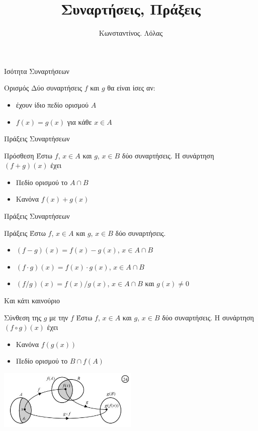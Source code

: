 \documentclass[greek]{beamer}
\title{Συναρτήσεις, Πράξεις}
\author[Λόλας]{Κωνσταντίνος. Λόλας}
\date{}
\begin{document}
\begin{frame}
 \titlepage
\end{frame}
\begin{frame}{Ισότητα Συναρτήσεων}
 \begin{block}{Ορισμός}
  Δύο συναρτήσεις $f$ και $g$ θα είναι ίσες αν:
  \begin{itemize}
   \item έχουν ίδιο πεδίο ορισμού $Α$
   \item $f(x)=g(x)$ για κάθε $x\in Α$
  \end{itemize}
 \end{block}
\end{frame}

\begin{frame}{Πράξεις Συναρτήσεων}
 \begin{block}{Πρόσθεση}
  Έστω $f$, $x\in Α$ και $g$, $x\in Β$ δύο συναρτήσεις. Η συνάρτηση $(f+g)(x)$ έχει
  \begin{itemize}
   \item Πεδίο ορισμού το $A\cap Β$
   \item Κανόνα $f(x)+g(x)$
  \end{itemize}
 \end{block}
\end{frame}

\begin{frame}{Πράξεις Συναρτήσεων}
 \begin{block}{Πράξεις}
  Έστω $f$, $x\in Α$ και $g$, $x\in Β$ δύο συναρτήσεις.
  \begin{itemize}
   \item $(f-g)(x)=f(x)-g(x)$, $x\in A\cap Β$
   \item $(f\cdot g)(x)=f(x)\cdot g(x)$, $x\in A\cap Β$
   \item $(f/g)(x)=f(x)/g(x)$, $x\in A\cap Β$ και $g(x)\ne 0$
  \end{itemize}
 \end{block}
\end{frame}

\begin{frame}{Και κάτι καινούριο}
 \begin{block}{Σύνθεση της $g$ με την $f$}
  Έστω $f$, $x\in Α$ και $g$, $x\in Β$ δύο συναρτήσεις. Η συνάρτηση $(f\circ g)(x)$ έχει
  \begin{itemize}
   \item Κανόνα $f(g(x))$
   \item Πεδίο ορισμού το $Β\cap f(Α)$
  \end{itemize}
 \end{block}
 \centering
 \includegraphics[width=0.5\textwidth]{"images/1.2 Σύνθεση.png"}
\end{frame}
\end{document}
